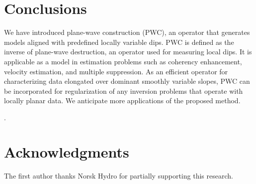 \section{Conclusions}

We have introduced plane-wave construction (PWC), an operator that
generates models aligned with predefined locally variable dips. PWC is
defined as the inverse of plane-wave destruction, an operator used for
measuring local dips.  It is applicable as a model
  in 
 estimation problems such as coherency enhancement,
 velocity estimation, and multiple suppression. As an
efficient operator for characterizing data elongated over dominant
smoothly variable slopes, PWC can be incorporated for regularization
of any inversion problems that operate with locally planar data. We
anticipate more applications of the proposed method.

.

\section{Acknowledgments}

The first author thanks Norsk Hydro for partially supporting this
research. 




